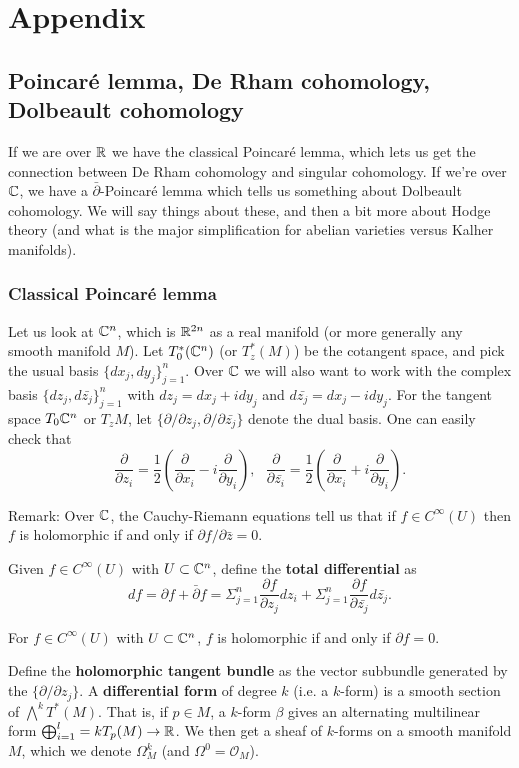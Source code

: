 



\section{Appendix}\label{Chapters/appendix}

\subsection{Poincar\'{e} lemma, De Rham cohomology, Dolbeault cohomology}

If we are over ${\mathbb R}$ we have the classical Poincar\'{e} lemma, which lets us get the connection between De Rham cohomology and singular cohomology. If we're over ${\mathbb C}$, we have a $\bar{\partial}$-Poincar\'{e} lemma which tells us something about Dolbeault cohomology. We will say things about these, and then a bit more about Hodge theory (and what is the major simplification for abelian varieties versus Kalher manifolds).

\subsubsection{Classical Poincar\'{e} lemma} 
Let us look at ${\mathbb C}^n$, which is ${\mathbb R}^{2n}$ as a real manifold (or more generally any smooth manifold $M$). Let $T_0^*({\mathbb C}^n)$ (or $T_z^*(M)$) be the cotangent space, and pick the usual basis $\{dx_j,dy_j\}_{j=1}^n$. Over ${\mathbb C}$ we will also want to work with the complex basis $\{dz_j,d\bar{z_j}\}_{j=1}^n$ with $dz_j=dx_j+idy_j$ and $d\bar{z_j}=dx_j-idy_j$. For the tangent space $T_0 {\mathbb C}^n$ or $T_z M$, let $\{\partial/\partial z_j,\partial/\partial \bar{z_j}\}$ denote the dual basis. One can easily check that 
$$\frac{\partial}{\partial z_i}=\frac{1}{2}\left(\frac{\partial}{\partial x_i}-i\frac{\partial}{\partial y_i}\right),\ \ \ \frac{\partial}{\partial \bar{z_i}}=\frac{1}{2}\left(\frac{\partial}{\partial x_i}+i\frac{\partial}{\partial y_i}\right).$$

Remark: Over ${\mathbb C}$, the Cauchy-Riemann equations tell us that if $f\in C^\infty(U)$ then $f$ is holomorphic if and only if $\partial f/\partial \bar{z}=0$. 

Given $f\in C^\infty(U)$ with $U\subset {\mathbb C}^n$, define the \textbf{total differential} as 
$$df=\partial f+\bar{\partial}f=\Sigma_{j=1}^n \frac{\partial f}{\partial z_j}dz_i+\Sigma_{j=1}^n \frac{\partial f}{\partial \bar{z_j}}d\bar{z_j}.$$

\begin{theorem}
For $f\in C^\infty(U)$ with $U\subset {\mathbb C}^n$, $f$ is holomorphic if and only if $\partial f=0$. 
\end{theorem}

Define the \textbf{holomorphic tangent bundle} as the vector subbundle generated by the $\{\partial/\partial z_j\}$. A \textbf{differential form} of degree $k$ (i.e. a $k$-form) is a smooth section of $\bigwedge^k T^*(M)$. That is, if $p\in M$, a $k$-form $\beta$ gives an alternating multilinear form $\bigoplus_{i=1}^l=k T_p(M)\to {\mathbb R}$. We then get a sheaf of $k$-forms on a smooth manifold $M$, which we denote $\Omega_M^k$ (and $\Omega^0=\mathcal{O}_M$). 